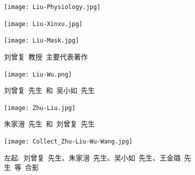 \newpage
\begin{figure}[h!]
\centering
\vspace{-0.2in}
\texttt{[image: Liu-Physiology.jpg]}
\label{Liu-Physiology}
\end{figure}
\begin{figure}[hbtp!]
\hspace*{-0.4in}
\begin{minipage}[t]{0.48\textwidth}
	\centering
\texttt{[image: Liu-Xinxu.jpg]}
\end{minipage}
\hspace{0.3in}
\begin{minipage}[t]{0.48\textwidth}
	\centering
\texttt{[image: Liu-Mask.jpg]}
\end{minipage}
\vspace{1.0pt}
\caption*{\hei 刘曾复~教授~主要代表著作}
\label{Major_Works}
\end{figure}

\newpage
\begin{figure}[h!]
\centering
\texttt{[image: Liu-Wu.png]}
\caption*{\hei 刘曾复~先生~和~吴小如~先生}
\label{Collect_Liu_Wu}
\end{figure}

\newpage
\begin{figure}[h!]
\centering
\texttt{[image: Zhu-Liu.jpg]}
\caption*{\hei 朱家溍~先生~和~刘曾复~先生}
\label{Collect_Zhu_Wu}
\end{figure}

\begin{figure}[h!]
\centering
\texttt{[image: Collect\_Zhu-Liu-Wu-Wang.jpg]}
\caption*{\hei 左起:~刘曾复~先生、朱家溍~先生、吴小如~先生、王金璐~先生~等~合影}
\label{Collect_Liy_Zhu_Wu_Wang}
\end{figure}

